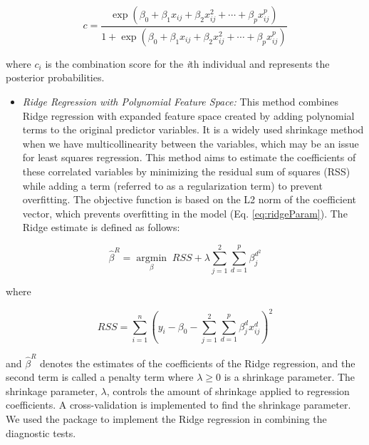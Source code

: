 \begin{equation}
c = \frac{\exp\left(\beta_0 + \beta_1 x_{ij} + \beta_2 x_{ij}^2 + \cdots + \beta_p x_{ij}^p\right)}{1 + \exp\left(\beta_0 + \beta_1 x_{ij} + \beta_2 x_{ij}^2 + \cdots + \beta_p x_{ij}^p\right)}
  \label{eq:polyLogitComb}
\end{equation}

where \(c_i\) is the combination score for the \emph{i}th individual and represents the posterior probabilities.

\begin{itemize}
\tightlist
\item
  \emph{Ridge Regression with Polynomial Feature Space:}
  This method combines Ridge regression with expanded feature space created by adding polynomial terms to the original predictor variables. It is a widely used shrinkage method when we have multicollinearity between the variables, which may be an issue for least squares regression. This method aims to estimate the coefficients of these correlated variables by minimizing the residual sum of squares (RSS) while adding a term (referred to as a regularization term) to prevent overfitting. The objective function is based on the L2 norm of the coefficient vector, which prevents overfitting in the model (Eq. \eqref{eq:ridgeParam}). The Ridge estimate is defined as follows:
\end{itemize}

\begin{equation}
\hat{\beta}^R = \operatorname*{argmin}_{\beta} \; RSS + \lambda \sum_{j=1}^{2} \sum_{d=1}^{p} \beta_{j}^{d^2}
  \label{eq:ridgeParam}
\end{equation}

where

\begin{equation}
RSS = \sum_{i=1}^{n} \left( y_i - \beta_0 - \sum_{j=1}^{2} \sum_{d=1}^{p} \beta_j^d x_{ij}^d \right)^2
  \label{eq:rssPoly}
\end{equation}

and \(\hat{\beta}^R\) denotes the estimates of the coefficients of the Ridge regression, and the second term is called a penalty term where \(\lambda \geq 0\) is a shrinkage parameter. The shrinkage parameter, \(\lambda\), controls the amount of shrinkage applied to regression coefficients. A cross-validation is implemented to find the shrinkage parameter. We used the  package \citep{friedman2010regularization} to implement the Ridge regression in combining the diagnostic tests.

